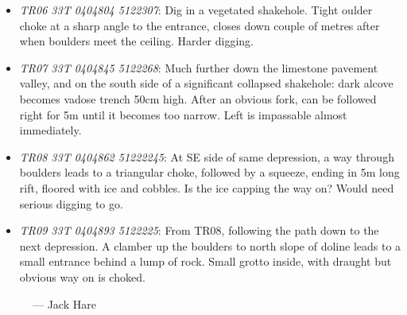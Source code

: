 \begin{itemize}
	\item \emph{TR06 33T 0404804 5122307}: Dig in a vegetated shakehole. Tight oulder choke at a sharp angle to the entrance, closes down couple of metres after when boulders meet the ceiling. Harder digging.

	\item \emph{TR07 33T 0404845 5122268}: Much further down the limestone pavement valley, and on the south side of a significant collapsed shakehole: dark alcove becomes vadose trench 50cm high. After an obvious fork, can be followed right for 5m until it becomes too narrow. Left is impassable almost immediately.

	\item \emph{TR08 33T 0404862 51222245}:  At SE side of same depression,  a way through boulders leads to a triangular choke, followed by a squeeze, ending in 5m long rift, floored with ice and cobbles. Is the ice capping the way on? Would need serious digging to go.

	\item \emph{TR09 33T 0404893 5122225}: From TR08, following the path down to the next depression. A clamber up the boulders to north slope of doline leads to a small entrance behind a lump of rock. Small grotto inside, with draught but obvious way on is choked.

\end{itemize}


	\begin{figure*}[b!]
	\checkoddpage \ifoddpage \forcerectofloat \else \forceversofloat \fi
		\centering
		 \caption{--- Jack Hare}
		 \label{shakehole near M24}
	\end{figure*}

   	